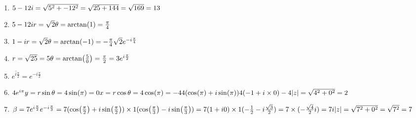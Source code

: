 \documentclass[a4paper]{article}
\begin{document}
\begin{enumerate}[1.]
        \item $5-12i
        =\sqrt{5^2 + -12^2}\\
        =\sqrt{25+144}\\
        =\sqrt{169}\\
        =13
        $

        \item $
        5-12i\\
        r = \sqrt{2}\\
        \theta = \arctan(1)\\
        =\frac{\pi}{4}
        $

        \item $1-i\\
        r = \sqrt{2}\\
        \theta = \arctan(-1)\\
        =-\frac{\pi}{4}\\
        \sqrt{2} e^{-i\frac{\pi}{4}}\\
        $

        \item $
        r = \sqrt{25} = 5\\
        \theta = \arctan(\frac{5}{0})\\
        =\frac{\pi}{2}\\
        =3e^{i\frac{\pi}{2}}
        $

        \item $
        \overline{e^{i\frac{\pi}{2}}} = e^{-i\frac{\pi}{2}}
        $

        \item $4e^{i\pi}\\
        y = r \sin \theta\\
        = 4 \sin(\pi)\\
        = 0\\
        \\
        x = r \cos \theta \\
        = 4 \cos(\pi)\\
        = -4\\
        \\
        4(\cos(\pi) + i \sin(\pi))\\
        4(-1 + i \times 0)\\
        -4\\
        \\
        \abs{z} = \sqrt{4^2 + 0^2}\\
        = 2
        $

        \item $\beta = 7e^{i\frac{\pi}{2}}e^{-i\frac{\pi}{3}}\\
        =7(\cos(\frac{\pi}{2}) + i \sin(\frac{\pi}{2})) \times 1(\cos(\frac{\pi}{3})-i\sin(\frac{\pi}{3}))\\
        =7(1+i0) \times 1(-\frac{1}{2} - i \frac{\sqrt{3}}{2})\\
        =7 \times (-\frac{\sqrt{4}}{2}i)\\
        =7i\\
        \\
        \abs{z}=\sqrt{7^2+0^2}\\
        =\sqrt{7^2}\\
        =7
        $
    \end{enumerate}
\end{document}
